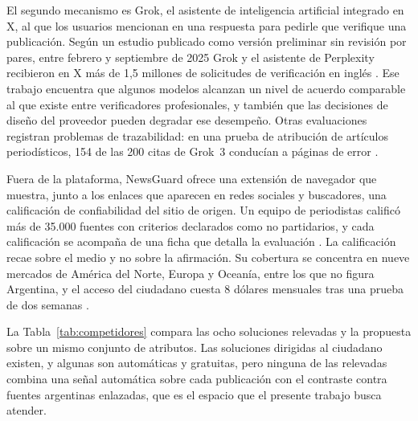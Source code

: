 El segundo mecanismo es Grok, el asistente de inteligencia artificial integrado en X, al que los usuarios mencionan en una respuesta para pedirle que verifique una publicación. Según un estudio publicado como versión preliminar sin revisión por pares, entre febrero y septiembre de 2025 Grok y el asistente de Perplexity recibieron en X más de 1,5 millones de solicitudes de verificación en inglés \parencite{RenaultEtAl2026}. Ese trabajo encuentra que algunos modelos alcanzan un nivel de acuerdo comparable al que existe entre verificadores profesionales, y también que las decisiones de diseño del proveedor pueden degradar ese desempeño. Otras evaluaciones registran problemas de trazabilidad: en una prueba de atribución de artículos periodísticos, 154 de las 200 citas de Grok~3 conducían a páginas de error \parencite{JazwinskaChandrasekar2025}.

Fuera de la plataforma, NewsGuard ofrece una extensión de navegador que muestra, junto a los enlaces que aparecen en redes sociales y buscadores, una calificación de confiabilidad del sitio de origen. Un equipo de periodistas calificó más de 35.000 fuentes con criterios declarados como no partidarios, y cada calificación se acompaña de una ficha que detalla la evaluación \parencite{NewsGuard2026}. La calificación recae sobre el medio y no sobre la afirmación. Su cobertura se concentra en nueve mercados de América del Norte, Europa y Oceanía, entre los que no figura Argentina, y el acceso del ciudadano cuesta 8 dólares mensuales tras una prueba de dos semanas \parencite{NewsGuard2026}.

La Tabla~\ref{tab:competidores} compara las ocho soluciones relevadas y la propuesta sobre un mismo conjunto de atributos. Las soluciones dirigidas al ciudadano existen, y algunas son automáticas y gratuitas, pero ninguna de las relevadas combina una señal automática sobre cada publicación con el contraste contra fuentes argentinas enlazadas, que es el espacio que el presente trabajo busca atender.

